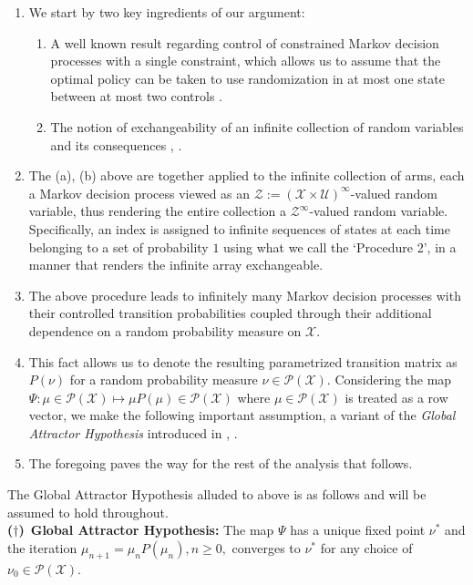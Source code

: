 \documentclass[12pt]{article}
\numberwithin{equation}{section}
\newcommand{\PA}{\mathcal{P}}
\newcommand{\1}{\textbf{1}}
\newcommand{\U}{\mathcal{U}}
\newcommand{\X}{\mathcal{X}}
\newcommand{\ZA}{\mathcal{Z}}
\newcommand{\dg}{\textbf{($\dagger$)}}
\begin{document}
\begin{enumerate}
\item We start by two key ingredients of our argument:
\begin{enumerate}
\item A well known result regarding control of constrained Markov decision processes with a single constraint, which allows us to assume that the optimal policy can be taken to  use randomization in at most one state between at most two controls \cite{Ross}. 

\item The notion of exchangeability of an infinite collection of random variables and its consequences \cite{Kingman}, \cite{Olshen}. 
\end{enumerate}

\item The (a), (b) above are together applied  to the infinite collection of arms, each a Markov decision process viewed as an $\ZA := (\X\times\U)^\infty$-valued random variable, thus rendering the entire collection a $\ZA^\infty$-valued random variable. Specifically, an index is assigned to infinite sequences of states at each time belonging to a set of probability $1$ using what we call the `Procedure 2', in a manner that renders the infinite array  exchangeable. 

\item The  above procedure leads to infinitely many Markov decision processes with their controlled transition probabilities coupled through their additional dependence on a random probability measure on $\X$.

\item This fact allows us to denote the resulting parametrized transition matrix as $P(\nu)$ for a random probability measure $\nu \in \PA(\X)$. Considering the map $\Psi: \mu \in \PA(\X) \mapsto \mu P(\mu) \in \PA(\X)$ where $\mu \in \PA(\X)$ is treated as a row vector, we make the following important assumption, a variant of the \textit{Global Attractor Hypothesis} introduced in \cite{Gast}, \cite{Verloop}.

\item The foregoing paves the way for the rest of the analysis that follows.
\end{enumerate}

The  Global Attractor Hypothesis alluded to above is as follows and will be assumed to hold throughout.\\

\noindent \dg \ \textbf{Global Attractor Hypothesis:} 
 The map $\Psi$ has a unique fixed point $\nu^*$ and the iteration $\mu_{n+1} = \mu_nP(\mu_n), n \geq 0,$ converges to $\nu^*$ for any choice of $\nu_0 \in \PA(\X)$.\\
 
\end{document}
